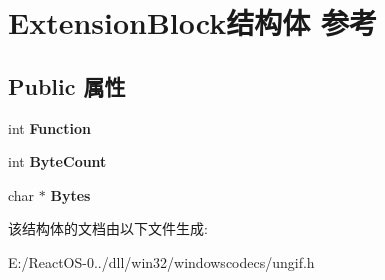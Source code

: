 \hypertarget{struct_extension_block}{}\section{Extension\+Block结构体 参考}
\label{struct_extension_block}
\subsection*{Public 属性}
\begin{DoxyCompactItemize}
\item 
\mbox{\label{struct_extension_block_aea646f44762a343fd49edd5a7845b529}} 
int {\bfseries Function}
\item 
\mbox{\label{struct_extension_block_a90558689baaf5e8f107b272e5ba84d26}} 
int {\bfseries Byte\+Count}
\item 
\mbox{\label{struct_extension_block_a09e19911958bf93d79f70da1d8f80aed}} 
char $\ast$ {\bfseries Bytes}
\end{DoxyCompactItemize}


该结构体的文档由以下文件生成\+:\begin{DoxyCompactItemize}
\item 
E\+:/\+React\+O\+S-\/0../dll/win32/windowscodecs/ungif.\+h\end{DoxyCompactItemize}
